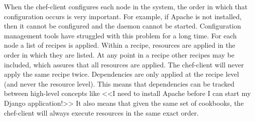 When the chef-client configures each node in the system, the order in which that configuration occurs is very important. For example, if Apache is not installed, then it cannot be configured and the daemon cannot be started. Configuration management tools have struggled with this problem for a long time. For each node a list of recipes is applied. Within a recipe, resources are applied in the order in which they are listed. At any point in a recipe other recipes may be included, which assures that all resources are applied. The chef-client will never apply the same recipe twice. Dependencies are only applied at the recipe level (and never the resource level). This means that dependencies can be tracked between high-level concepts like <<I need to install Apache before I can start my Django application!>> It also means that given the same set of cookbooks, the chef-client will always execute resources in the same exact order.